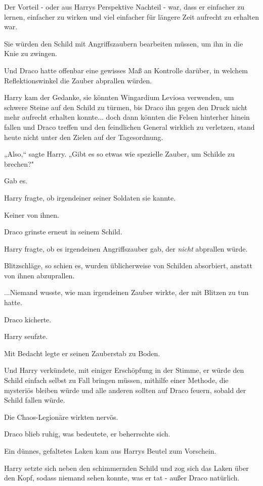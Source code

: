 {Der Vorteil - oder aus Harrys Perspektive Nachteil - war, dass er einfacher zu lernen, einfacher zu wirken und viel einfacher für längere Zeit aufrecht zu erhalten war.

Sie würden den Schild mit Angriffszaubern bearbeiten müssen, um ihn in die Knie zu zwingen.

Und Draco hatte offenbar eine gewisses Maß an Kontrolle darüber, in welchem Reflektionswinkel die Zauber abprallen würden.

Harry kam der Gedanke, sie könnten Wingardium Leviosa verwenden, um schwere Steine auf den Schild zu türmen, bis Draco ihn gegen den Druck nicht mehr aufrecht erhalten konnte... doch dann könnten die Felsen hinterher hinein fallen und Draco treffen und den feindlichen General wirklich zu verletzen, stand heute nicht unter den Zielen auf der Tagesordnung.

„Also,“ sagte Harry. „Gibt es so etwas wie spezielle Zauber, um Schilde zu brechen?"

Gab es.

Harry fragte, ob irgendeiner seiner Soldaten sie kannte.

Keiner von ihnen.

Draco grinste erneut in seinem Schild.

Harry fragte, ob es irgendeinen Angriffszauber gab, der \emph{nicht} abprallen würde.

Blitzschläge, so schien es, wurden üblicherweise von Schilden absorbiert, anstatt von ihnen abzuprallen.

...Niemand wusste, wie man irgendeinen Zauber wirkte, der mit Blitzen zu tun hatte.

Draco kicherte.

Harry seufzte.

Mit Bedacht legte er seinen Zauberstab zu Boden.

Und Harry verkündete, mit einiger Erschöpfung in der Stimme, er würde den Schild einfach selbst zu Fall bringen müssen, mithilfe einer Methode, die mysteriös bleiben würde und alle anderen sollten auf Draco feuern, sobald der Schild fallen würde.

Die Chaos-Legionäre wirkten nervös.

Draco blieb ruhig, was bedeutete, er beherrschte sich.

Ein dünnes, gefaltetes Laken kam aus Harrys Beutel zum Vorschein.

Harry setzte sich neben den schimmernden Schild und zog sich das Laken über den Kopf, sodass niemand sehen konnte, was er tat - außer Draco natürlich.

}
